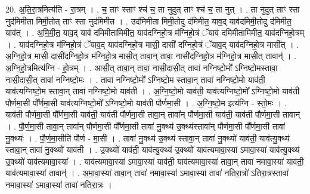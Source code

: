 \documentclass[17pt]{extarticle}
\begin{document}
20. अ॒ति॒रा॒त्रमित्य॑ति - रा॒त्रम् । . च॒ ताꣳ स्ताꣳ श्च॑ च॒ ता नुदुत् ताꣳ श्च॑ च॒ ता नुत् । . ता नुदुत् ताꣳ स्ता नुद॑मिमीता मिमी॒तोत् ताꣳ स्ता नुद॑मिमीत । . उद॑मिमीता मिमी॒तोदु द॑मिमीत॒ याव॒द् याव॑दमिमी॒तोदु द॑मिमीत॒ याव॑त् । . अ॒मि॒मी॒त॒ याव॒द् याव॑ दमिमीतामिमीत॒ याव॑दग्निहो॒त्र म॑ग्निहो॒त्रं ॅयाव॑ दमिमीतामिमीत॒ याव॑दग्निहो॒त्रम् । . याव॑दग्निहो॒त्र म॑ग्निहो॒त्रं ॅयाव॒द् याव॑दग्निहो॒त्र मासी॒ दासी॑ दग्निहो॒त्रं ॅयाव॒द् याव॑दग्निहो॒त्र मासी᳚त् । . अ॒ग्नि॒हो॒त्र मासी॒ दासी॑दग्निहो॒त्र म॑ग्निहो॒त्र मासी॒त् तावा॒न् तावा॒ नासी॑दग्निहो॒त्र म॑ग्निहो॒त्र मासी॒त् तावान्॑ । . अ॒ग्नि॒हो॒त्रमित्य॑ग्नि - हो॒त्रम् । . आसी॒त् तावा॒न् तावा॒ नासी॒दासी॒त् तावा॑ नग्निष्टो॒मो᳚ ऽग्निष्टो॒मस्तावा॒ नासी॒दासी॒त् तावा॑ नग्निष्टो॒मः । . तावा॑ नग्निष्टो॒मो᳚ ऽग्निष्टो॒म स्तावा॒न् तावा॑ नग्निष्टो॒मो याव॑ती॒ याव॑त्यग्निष्टो॒म स्तावा॒न् तावा॑ नग्निष्टो॒मो याव॑ती । . अ॒ग्नि॒ष्टो॒मो याव॑ती॒ याव॑त्यग्निष्टो॒मो᳚ ऽग्निष्टो॒मो याव॑ती पौर्णमा॒सी पौ᳚र्णमा॒सी याव॑त्यग्निष्टो॒मो᳚ ऽग्निष्टो॒मो याव॑ती पौर्णमा॒सी । . अ॒ग्नि॒ष्टो॒म इत्य॑ग्नि - स्तो॒मः । . याव॑ती पौर्णमा॒सी पौ᳚र्णमा॒सी याव॑ती॒ याव॑ती पौर्णमा॒सी तावा॒न् तावा᳚न् पौर्णमा॒सी याव॑ती॒ याव॑ती पौर्णमा॒सी तावान्॑ । . पौ॒र्ण॒मा॒सी तावा॒न् तावा᳚न् पौर्णमा॒सी पौ᳚र्णमा॒सी तावा॑ नु॒क्थ्य॑ उ॒क्थ्य॑स्तावा᳚न् पौर्णमा॒सी पौ᳚र्णमा॒सी तावा॑ नु॒क्थ्यः॑ । . पौ॒र्ण॒मा॒सीति॑ पौर्ण - मा॒सी । . तावा॑ नु॒क्थ्य॑ उ॒क्थ्य॑ स्तावा॒न् तावा॑ नु॒क्थ्यो॑ याव॑ती॒ याव॑त्यु॒क्थ्य॑ स्तावा॒न् तावा॑ नु॒क्थ्यो॑ याव॑ती । . उ॒क्थ्यो॑ याव॑ती॒ याव॑त्यु॒क्थ्य॑ उ॒क्थ्यो॑ याव॑त्यमावा॒स्या॑ ऽमावा॒स्या॑ याव॑त्यु॒क्थ्य॑ उ॒क्थ्यो॑ याव॑त्यमावा॒स्या᳚ । . याव॑त्यमावा॒स्या॑ ऽमावा॒स्या॑ याव॑ती॒ याव॑त्यमावा॒स्या॑ तावा॒न् तावा॑ नमावा॒स्या॑ याव॑ती॒ याव॑त्यमावा॒स्या॑ तावान्॑ । . अ॒मा॒वा॒स्या॑ तावा॒न् तावा॑ नमावा॒स्या॑ ऽमावा॒स्या॑ तावा॑ नतिरा॒त्रो॑ ऽतिरा॒त्रस्तावा॑ नमावा॒स्या॑ ऽमावा॒स्या॑ तावा॑ नतिरा॒त्रः । \newline
\end{document}
